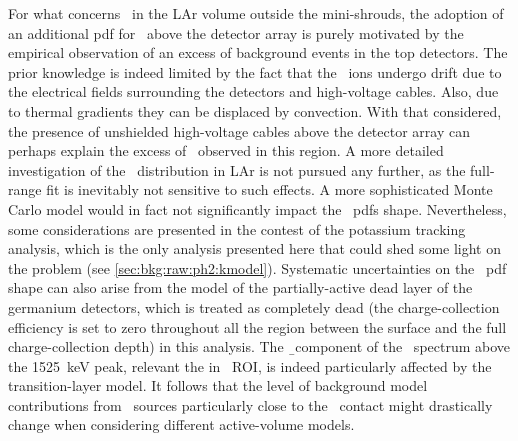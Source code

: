 \blocktitle{\kvz}
For what concerns \kvz\ in the LAr volume outside the mini-shrouds, the adoption of an
additional pdf for \kvz\ above the detector array is purely motivated by the empirical
observation of an excess of background events in the top detectors. The prior knowledge is
indeed limited by the fact that the \kvz\ ions undergo drift due to the electrical fields
surrounding the detectors and high-voltage cables. Also, due to thermal gradients they can
be displaced by convection. With that considered, the presence of unshielded high-voltage
cables above the detector array can perhaps explain the excess of \kvz\ observed in this
region. A more detailed investigation of the \kvz\ distribution in LAr is not pursued any
further, as the full-range fit is inevitably not sensitive to such effects. A more
sophisticated Monte Carlo model would in fact not significantly impact the \kvz\ pdfs
shape. Nevertheless, some considerations are presented in the contest of the
potassium tracking analysis, which is the only analysis presented here that could shed
some light on the problem (see \cref{sec:bkg:raw:ph2:kmodel}). Systematic uncertainties on
the \kvz\ pdf shape can also arise from the model of the partially-active dead layer of
the germanium detectors, which is treated as completely dead (the charge-collection
efficiency is set to zero throughout all the region between the surface and the full
charge-collection depth) in this analysis. The \b\ component of the \kvz\ spectrum above
the 1525~keV peak, relevant the in \onbb\ ROI, is indeed particularly affected by the
transition-layer model. It follows that the level of background model contributions from
\kvz\ sources particularly close to the \nplus\ contact might drastically change when
considering different active-volume models.

